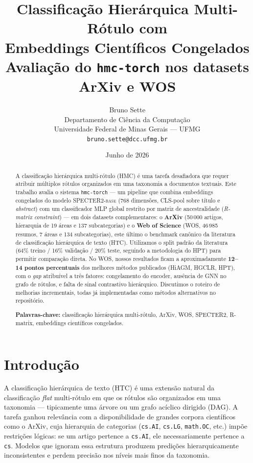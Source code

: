 \documentclass[11pt,a4paper,twoside]{article}
\title{
  {\LARGE Classificação Hierárquica Multi-Rótulo com}\\[0.3em]
  {\LARGE Embeddings Científicos Congelados}\\[0.6em]
  {\large Avaliação do \texttt{hmc-torch} nos datasets ArXiv e WOS}
}
\author{
  Bruno Sette\\[0.3em]
  \small Departamento de Ciência da Computação\\[0.1em]
  \small Universidade Federal de Minas Gerais --- UFMG\\[0.4em]
  \small\texttt{bruno.sette@dcc.ufmg.br}
}
\date{\small Junho de 2026}
\begin{document}
\maketitle

\begin{abstract}
A classificação hierárquica multi-rótulo (HMC) é uma tarefa desafiadora que requer
atribuir múltiplos rótulos organizados em uma taxonomia a documentos textuais. Este
trabalho avalia o sistema \texttt{hmc-torch} --- um pipeline que combina embeddings
congelados do modelo \textsc{SPECTER2-base} (768 dimensões, CLS-pool sobre título e
\textit{abstract}) com um classificador MLP global restrito por matriz de
ancestralidade (\textit{R-matrix constraint}) --- em dois datasets complementares:
o \textbf{ArXiv} (50\,000 artigos, hierarquia de 19 áreas e 137 subcategorias) e o
\textbf{Web of Science} (WOS, 46\,985 resumos, 7 áreas e 134 subcategorias), este
último o benchmark canônico da literatura de classificação hierárquica de texto (HTC).
Utilizamos o split padrão da literatura (64\% treino / 16\% validação / 20\% teste,
seguindo a metodologia do HPT) para permitir comparação direta. No WOS, nossos
resultados ficam a aproximadamente \textbf{12--14 pontos percentuais} dos melhores
métodos publicados (HiAGM, HGCLR, HPT), com o \textit{gap} atribuível a três fatores:
congelamento do encoder, ausência de GNN no grafo de rótulos, e falta de sinal
contrastivo hierárquico. Discutimos o roteiro de melhorias incrementais, todas já
implementadas como métodos alternativos no repositório.

\vspace{0.6em}
\noindent\textbf{Palavras-chave:} classificação hierárquica multi-rótulo,
ArXiv, WOS, SPECTER2, R-matrix, embeddings científicos congelados.
\end{abstract}

\section{Introdução}

A classificação hierárquica de texto (HTC) é uma extensão natural da classificação
\textit{flat} multi-rótulo em que os rótulos são organizados em uma taxonomia ---
tipicamente uma árvore ou um grafo acíclico dirigido (DAG). A tarefa ganhou relevância
com a disponibilidade de grandes corpora científicos como o ArXiv, cuja hierarquia de
categorias (\texttt{cs.AI}, \texttt{cs.LG}, \texttt{math.OC}, etc.) impõe restrições
lógicas: se um artigo pertence a \texttt{cs.AI}, ele necessariamente pertence a
\texttt{cs}. Modelos que ignoram essa estrutura produzem predições hierarquicamente
inconsistentes e perdem precisão nos níveis mais finos da taxonomia.
\end{document}
